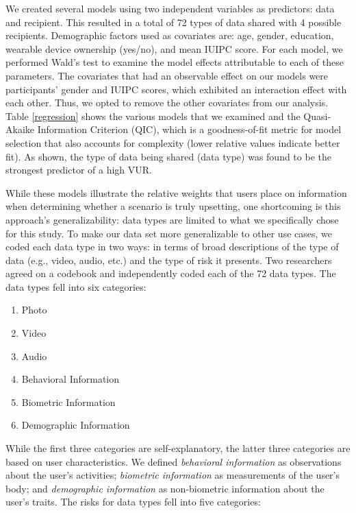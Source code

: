 \documentclass[conference]{IEEEtran}
\begin{document}
We created several models using two independent variables as predictors: data and recipient. This resulted in a total of 72 types of data shared with 4 possible recipients. Demographic factors used as covariates are: age, gender, education, wearable device ownership (yes/no), and mean IUIPC score. For each model, we performed Wald's test to examine the model effects attributable to each of these parameters. The covariates that had an observable effect on our models were participants' gender and IUIPC scores, which exhibited an interaction effect with each other. Thus, we opted to remove the other covariates from our analysis. Table \ref{regression} shows the various models that we examined and the Quasi-Akaike Information Criterion (QIC), which is a goodness-of-fit metric for model selection that also accounts for complexity (lower relative values indicate better fit). As shown, the type of data being shared (data type) was found to be the strongest predictor of a high VUR.

While these models illustrate the relative weights that users place on information when determining whether a scenario is truly upsetting, one shortcoming is this approach's generalizability: data types are limited to what we specifically chose for this study. To make our data set more generalizable to other use cases, we coded each data type in two ways: in terms of broad descriptions of the type of data (e.g., video, audio, etc.) and the type of risk it presents. Two researchers agreed on a codebook and independently coded each of the 72 data types. The data types fell into six categories:

\begin{enumerate}%
\item Photo
\item Video
\item Audio
\item Behavioral Information
\item Biometric Information
\item Demographic Information
\end{enumerate}

While the first three categories are self-explanatory, the latter three categories are based on user characteristics. We defined {\it behavioral information} as observations about the user's activities; {\it biometric information} as measurements of the user's body; and {\it demographic information} as non-biometric information about the user's traits. The risks for data types fell into five categories:
\end{document}
